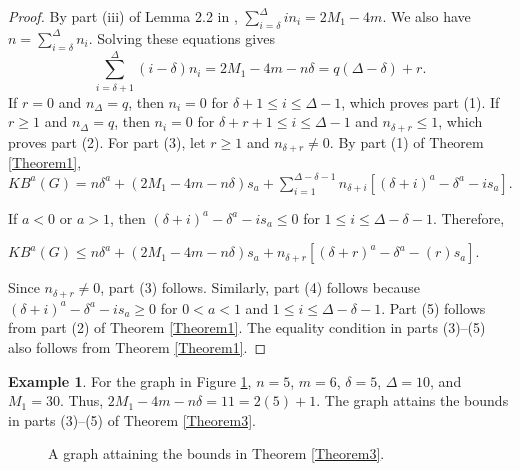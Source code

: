 \documentclass[11pt, oneside]{amsart}   	%
\theoremstyle{definition}
\newtheorem{example}[theorem]{Example}
\theoremstyle{remark}
\numberwithin{equation}{section}
\begin{document}
\begin{proof}
By part (iii) of Lemma 2.2 in \cite{basavanagoud2019kulli}, $\sum_{i=\delta}^\Delta i n_i=2M_1-4m$. We also have $n=\sum_{i=\delta}^\Delta n_i$. Solving these equations gives
\[
\sum_{i=\delta+1}^\Delta(i-\delta)n_i=2M_1-4m-n\delta=q(\Delta-\delta)+r.
\]
If $r=0$ and $n_\Delta=q$, then $n_i=0$ for $\delta+1\leq i\leq\Delta-1$, which proves part (1). If $r\geq1$ and $n_\Delta=q$, then $n_i=0$ for $\delta+r+1\leq i\leq\Delta-1$ and $n_{\delta+r}\leq1$, which proves part (2). For part (3), let $r\geq1$ and $n_{\delta+r}\neq0$. By part (1) of Theorem \ref{Theorem1},
$KB^a(G)=n\delta^a +  (2M_1 - 4m - n\delta)s_a +\sum_{i =1}^{\Delta - \delta - 1}n_{\delta + i} \left[(\delta + i)^a - \delta^a  - is_a\right].$

If $a<0$ or $a>1$, then $(\delta+i)^a-\delta^a-is_a\leq0$ for $1\leq i\leq\Delta-\delta-1$. Therefore,

$KB^a(G) \leq n\delta^a +  (2M_1 - 4m -n\delta)s_a + n_{\delta + r} \left[(\delta + r)^a - \delta^a  - (r)s_a\right].$

Since $n_{\delta+r}\neq0$, part (3) follows. Similarly, part (4) follows because $(\delta+i)^a-\delta^a-is_a\geq0$ for $0<a<1$ and $1\leq i\leq\Delta-\delta-1$. Part (5) follows from part (2) of Theorem \ref{Theorem1}. The equality condition in parts (3)--(5) also follows from Theorem \ref{Theorem1}.

\end{proof}

\begin{example}
For the graph in Figure \ref{fig:2}, $n=5$, $m=6$, $\delta=5$, $\Delta=10$, and $M_1=30$. Thus, $2M_1-4m-n\delta=11=2(5)+1$. The graph attains the bounds in parts (3)--(5) of Theorem \ref{Theorem3}.

\begin{figure}[h]
\centering
\begin{minipage}{.4\textwidth}
  \centering
\caption{A graph attaining the bounds in Theorem \ref{Theorem3}.}
  \label{fig:2}
\end{minipage}%

\end{figure}


\end{example}
\end{document}
